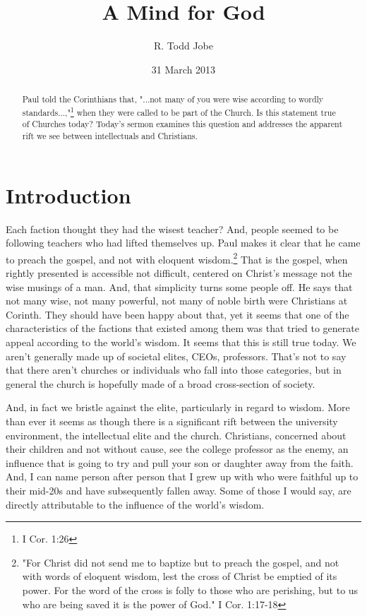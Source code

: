 \documentclass{tufte-handout}
\title{A Mind for God}
\author[R. Todd Jobe]{R. Todd Jobe}
\date{31 March 2013}  %
\begin{document}
\maketitle%

\begin{abstract}
\noindent Paul told the Corinthians that, "...not many of you were wise according to wordly standards...,"\footnote{I Cor. 1:26} when they were called to be part of the Church. Is this statement true of Churches today?  Today's sermon examines this question and addresses the apparent rift we see between intellectuals and Christians.
\end{abstract}

\section{Introduction}\label{sec:introduction}
  Each faction thought they had the wisest teacher? And, people seemed to be following teachers who had lifted themselves up.  Paul makes it clear that he came to preach the gospel, and not with eloquent wisdom.\footnote{"For Christ did not send me to baptize but to preach the gospel, and not with words of eloquent wisdom, lest the cross of Christ be emptied of its power.  For the word of the cross is folly to those who are perishing, but to us who are being saved it is the power of God." I Cor. 1:17-18} That is the gospel, when rightly presented is accessible not difficult, centered on Christ's message not the wise musings of a man.  And, that simplicity turns some people off.  He says that not many wise, not many powerful, not many of noble birth were Christians at Corinth.  They should have been happy about that, yet it seems that one of the characteristics of the factions that existed among them was that tried to generate appeal according to the world's wisdom.  It seems that this is still true today.  We aren't generally made up of societal elites, CEOs, professors.  That's not to say that there aren't churches or individuals who fall into those categories, but in general the church is hopefully made of a broad cross-section of society.  

And, in fact we bristle against the elite, particularly in regard to wisdom.  More than ever it seems as though there is a significant rift between the university environment, the intellectual elite and the church.  Christians, concerned about their children and not without cause, see the college professor as the enemy, an influence that is going to try and pull your son or daughter away from the faith.  And, I can name person after person that I grew up with who were faithful up to their mid-20s and have subsequently fallen away.  Some of those I would say, are directly attributable to the influence of the world's wisdom.
\end{document}
